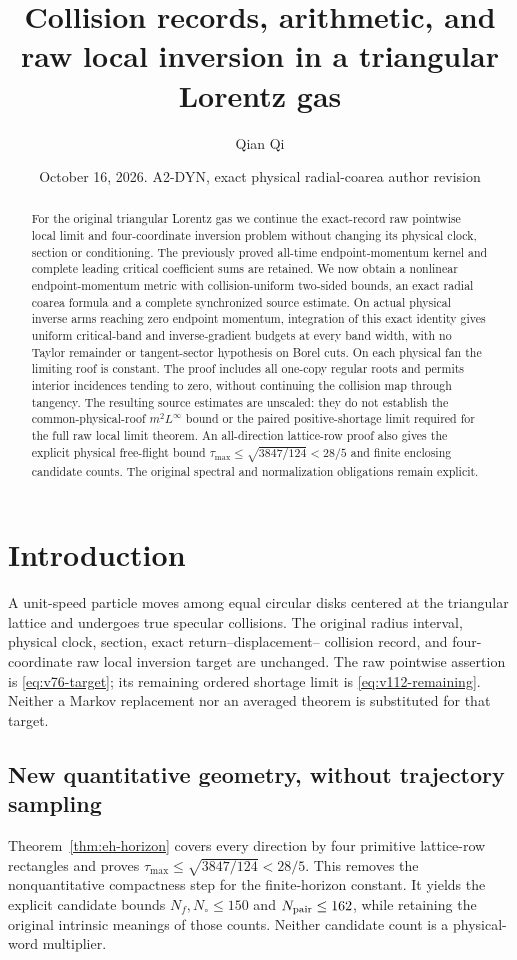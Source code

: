 \documentclass[11pt,reqno]{amsart}
\title[Collision records and raw local inversion]{Collision records, arithmetic, and raw local inversion in a triangular Lorentz gas}
\author{Qian Qi}
\date{October 16, 2026. A2-DYN, exact physical radial-coarea author revision}
\numberwithin{equation}{section}
\theoremstyle{definition}\newtheorem{definition}[theorem]{Definition}
\theoremstyle{remark}\newtheorem{remark}[theorem]{Remark}
\begin{document}
\raggedbottom
\begin{abstract}
For the original triangular Lorentz gas we continue the exact-record
raw pointwise local limit and four-coordinate inversion problem without
changing its physical clock, section or conditioning. The previously
proved all-time endpoint-momentum kernel and complete leading critical
coefficient sums are retained. We now obtain a nonlinear endpoint-momentum
metric with collision-uniform two-sided bounds, an exact radial coarea
formula and a complete synchronized source estimate. On actual physical
inverse arms reaching zero endpoint momentum, integration of this exact
identity gives uniform critical-band and inverse-gradient budgets at
every band width, with no Taylor remainder or tangent-sector hypothesis
on Borel cuts. On each physical fan the limiting roof is constant.
The proof includes all one-copy regular roots and permits interior
incidences tending to zero, without continuing the collision map through
tangency. The resulting source estimates are unscaled: they do not
establish the common-physical-roof $m^2L^\infty$ bound or the paired
positive-shortage limit required for the full raw local limit theorem.
An all-direction lattice-row proof also gives the explicit physical
free-flight bound $\tau_{\max}\le\sqrt{3847/124}<28/5$ and finite
enclosing candidate counts. The original spectral and normalization
obligations remain explicit.
\end{abstract}
\maketitle


\section*{Introduction}
A unit-speed particle moves among equal circular disks centered at the
triangular lattice and undergoes true specular collisions. The original
radius interval, physical clock, section, exact return--displacement--
collision record, and four-coordinate raw local inversion target are
unchanged. The raw pointwise assertion is \eqref{eq:v76-target}; its
remaining ordered shortage limit is \eqref{eq:v112-remaining}. Neither a
Markov replacement nor an averaged theorem is substituted for that target.

\subsection*{New quantitative geometry, without trajectory sampling}
Theorem~\ref{thm:eh-horizon} covers every direction by four primitive
lattice-row rectangles and proves
$\tau_{\max}\le\sqrt{3847/124}<28/5$. This removes the nonquantitative
compactness step for the finite-horizon constant. It yields the explicit
candidate bounds $N_f,N_\circ\le150$ and $N_{\rm pair}\le162$,
while retaining the original intrinsic meanings of those counts.
Neither candidate count is a physical-word multiplier.
\end{document}
